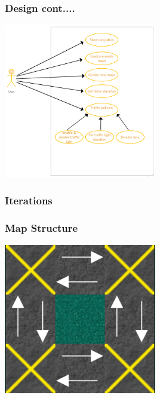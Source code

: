 \documentclass{beamer}
\begin{document}
  	\begin{frame}
	  \frametitle{Design cont....}
	    \includegraphics[width=0.50\textwidth, center]{UseCase}
	  
	  \end{frame}

	  \begin{frame}
      	  \frametitle{Iterations}

      	  \end{frame}

       \begin{frame}
      	  \frametitle{Map Structure}
      	     \includegraphics[width=0.5\textwidth, center]{map_structure}
      	  \end{frame}
\end{document}
